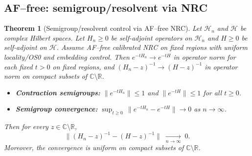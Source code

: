 \documentclass[11pt]{amsart}
\theoremstyle{plain}
\newtheorem{theorem}{Theorem}[section]
\theoremstyle{definition}
\theoremstyle{remark}
\begin{document}
\subsection*{AF--free: semigroup/resolvent via NRC}

\begin{theorem}[Semigroup/resolvent control via AF--free NRC]\label{thm:NRC-allz}
Let $\mathcal{H}_n$ and $\mathcal{H}$ be complex Hilbert spaces. Let $H_n\ge 0$ be self-adjoint operators on $\mathcal{H}_n$ and $H\ge 0$ be self-adjoint on $\mathcal{H}$. Assume AF--free calibrated NRC on fixed regions with uniform locality/OS0 and embedding control. Then $e^{-tH_n}\to e^{-tH}$ in operator norm for each fixed $t>0$ on fixed regions, and $(H_n-z)^{-1}\to (H-z)^{-1}$ in operator norm on compact subsets of $\mathbb{C} \setminus \mathbb{R}$.
\begin{itemize}
  \item[(H1)] \textbf{Contraction semigroups:} $\|e^{-tH_n}\| \le 1$ and $\|e^{-tH}\| \le 1$ for all $t \ge 0$.
  \item[(H2)] \textbf{Semigroup convergence:} $\sup_{t\ge 0}\,\|e^{-tH_n}-e^{-tH}\|\to 0$ as $n\to\infty$.
\end{itemize}
Then for every $z\in\mathbb C\setminus\mathbb R$,
\[
  \|(H_n-z)^{-1}-(H-z)^{-1}\|\;\xrightarrow[n\to\infty]{}\;0.
\]
Moreover, the convergence is uniform on compact subsets of $\mathbb{C} \setminus \mathbb{R}$.
\end{theorem}
\end{document}
